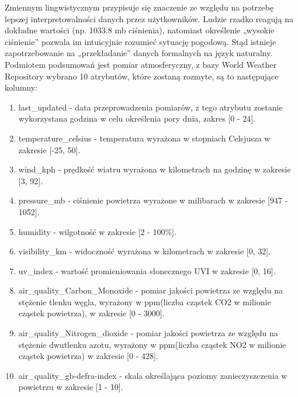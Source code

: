 \documentclass{article}
\begin{document}
Zmiennym lingwistycznym przypisuje się znaczenie ze względu na potrzebę lepszej interpretowalności danych przez użytkowników. Ludzie rzadko reagują na dokładne wartości (np. 1033.8 mb ciśnienia), natomiast określenie „wysokie ciśnienie” pozwala im intuicyjnie rozumieć sytuację pogodową. Stąd istnieje zapotrzebowanie na „przekładanie” danych formalnych na język naturalny. \\
Podmiotem podsumowań jest pomiar atmosferyczny, z bazy World Weather Repository wybrano 10 atrybutów, które zostaną rozmyte, są to następujące kolumny:
\begin{enumerate}
    \item last\_updated - data przeprowadzenia pomiarów, z tego atrybutu zostanie wykorzystana godzina w celu określenia pory dnia, zakres [0 - 24]. 
    \item temperature\_celsius - temperatura wyrażona w stopniach Celsjusza w zakresie [-25, 50].
    \item wind\_kph - prędkość wiatru wyrażona w kilometrach na godzinę w zakresie [3, 92]. 
    \item pressure\_mb - ciśnienie powietrza wyrażone w milibarach w zakresie [947 - 1052]. 
    \item humidity - wilgotność w zakresie [2 - 100\%].
    \item visibility\_km - widoczność wyrażona w kilometrach w zakresie [0, 32].
    \item uv\_index - wartość promieniowania słonecznego UVI w zakresie [0, 16].
    \item air\_quality\_Carbon\_Monoxide - pomiar jakości powietrza ze względu na stężenie tlenku węgla, wyrażony w ppm(liczba cząstek CO2 w milionie cząstek powietrza), w zakresie [0 - 3000].
    \item air\_quality\_Nitrogen\_dioxide - pomiar jakości powietrza ze względu na stężenie dwutlenku azotu, wyrażony w ppm(liczba cząstek NO2 w milionie cząstek powietrza) w zakresie [0 - 428].
    \item air\_quality\_gb-defra-index - skala określająca poziomy zanieczyszczenia w powietrzu w zakresie [1 - 10].

    
\end{enumerate}
\end{document}
